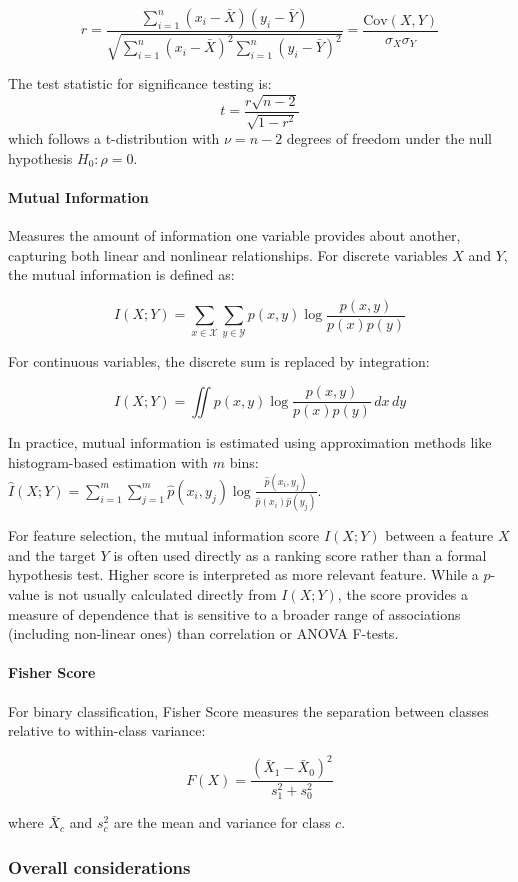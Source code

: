 \[
r = \frac{\sum_{i=1}^n (x_i - \bar{X})(y_i - \bar{Y})}{\sqrt{\sum_{i=1}^n (x_i - \bar{X})^2 \sum_{i=1}^n (y_i - \bar{Y})^2}} = \frac{\text{Cov}(X,Y)}{\sigma_X \sigma_Y}
\]

The test statistic for significance testing is:
\[
t = \frac{r\sqrt{n-2}}{\sqrt{1-r^2}}
\]
which follows a t-distribution with $\nu = n-2$ degrees of freedom under the null hypothesis $H_0: \rho = 0$.
\paragraph{Mutual Information}

Measures the amount of information one variable provides about another, capturing both linear and nonlinear relationships.
For discrete variables $X$ and $Y$, the mutual information is defined as:

\[
I(X;Y) = \sum_{x \in \mathcal{X}} \sum_{y \in \mathcal{Y}} p(x,y) \log \frac{p(x,y)}{p(x)p(y)}
\]

For continuous variables, the discrete sum is replaced by integration:

\[
I(X;Y) = \iint p(x,y) \log \frac{p(x,y)}{p(x)p(y)} \, dx \, dy
\]

In practice, mutual information is estimated using approximation methods like
histogram-based estimation with $m$ bins: $\hat{I}(X;Y) = \sum_{i=1}^m \sum_{j=1}^m \hat{p}(x_i, y_j) \log \frac{\hat{p}(x_i, y_j)}{\hat{p}(x_i)\hat{p}(y_j)}$.

For feature selection, the mutual information score  
$I(X;Y)$ between a feature $X$ and the target $Y$ is often used directly as a ranking score rather than a formal hypothesis test. Higher score is interpreted as more relevant feature.
While a $p$-value is not usually calculated directly from  
$I(X;Y)$, the score provides a measure of dependence that is sensitive to a broader range of associations (including non-linear ones) than correlation or ANOVA F-tests.


\paragraph{Fisher Score}
For binary classification, Fisher Score measures the separation between classes relative to within-class variance:

\[
F(X) = \frac{(\bar{X}_1 - \bar{X}_0)^2}{s_1^2 + s_0^2}
\]

where $\bar{X}_c$ and $s_c^2$ are the mean and variance for class $c$.
\subsubsection*{Overall considerations}

